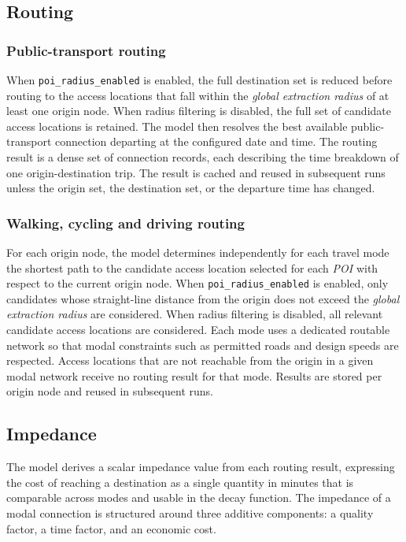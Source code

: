 \documentclass{article}
\begin{document}
\subsection{Routing}

\subsubsection*{Public-transport routing}
When \texttt{poi\_radius\_enabled} is enabled, the full destination set is
reduced before routing to the access locations that fall within the
\emph{global extraction radius} of at least one origin node. When radius
filtering is disabled, the full set of candidate access locations is retained. The model then resolves the best available public-transport connection departing at the configured date
and time. The routing result is a dense set of connection records, each
describing the time breakdown of one origin-destination trip. The result is
cached and reused in subsequent runs unless the origin set, the destination
set, or the departure time has changed.

\subsubsection*{Walking, cycling and driving routing}
For each origin node, the model determines independently for each travel mode
the shortest path to the candidate access location selected for each
\emph{POI} with respect to the current origin node. When
\texttt{poi\_radius\_enabled} is enabled, only candidates whose straight-line
distance from the origin does not exceed the \emph{global extraction radius}
are considered. When radius filtering is disabled, all relevant candidate
access locations are considered. Each mode uses a dedicated routable network so that modal constraints such as permitted roads and design speeds are respected. Access locations that are not
reachable from the origin in a given modal network receive no routing result
for that mode. Results are stored per origin node and reused in subsequent
runs.

\subsection{Impedance}
The model derives a scalar impedance value from each routing result, expressing
the cost of reaching a destination as a single quantity in minutes that is
comparable across modes and usable in the decay function. The impedance of a
modal connection is structured around three additive components: a quality
factor, a time factor, and an economic cost.
\end{document}
